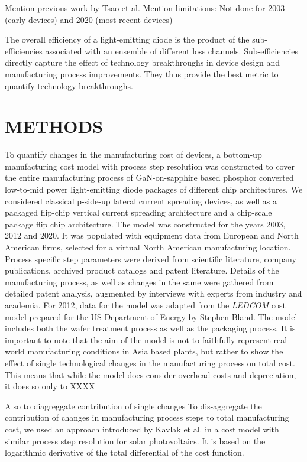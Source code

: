 \documentclass[a4paper]{spie}  %
\begin{document}
Mention previous work by Tsao et al.
Mention limitations: Not done for 2003 (early devices) and 2020 (most recent devices)

The overall efficiency of a light-emitting diode is the product of the sub-efficiencies associated with an ensemble of different loss channels. Sub-efficiencies directly capture the effect of technology breakthroughs in device design and manufacturing process improvements. They thus provide the best metric to quantify technology breakthroughs.
    
\clearpage

\section{METHODS}
\label{sec:methods}

To quantify changes in the manufacturing cost of devices, a bottom-up manufacturing cost model with process step resolution was constructed to cover the entire manufacturing process of GaN-on-sapphire based phosphor converted low-to-mid power light-emitting diode packages of different chip architectures. We considered classical p-side-up lateral current spreading devices, as well as a packaged flip-chip vertical current spreading architecture and a chip-scale package flip chip architecture. The model was constructed for the years 2003, 2012 and 2020. It was populated with equipment data from European and North American firms, selected for a virtual North American manufacturing location. Process specific step parameters were derived from scientific literature, company publications, archived product catalogs and patent literature. Details of the manufacturing process, as well as changes in the same were gathered from detailed patent analysis, augmented by interviews with experts from industry and academia. For 2012, data for the model was adapted from the \textit{LEDCOM} cost model prepared for the US Department of Energy by Stephen Bland. The model includes both the wafer treatment process as well as the packaging process. It is important to note that the aim of the model is not to faithfully represent real world manufacturing conditions in Asia based plants, but rather to show the effect of single technological changes in the manufacturing process on total cost. This means that while the model does consider overhead costs and depreciation, it does so only to XXXX 

Also to diagreggate contribution of single changes
To dis-aggregate the contribution of changes in manufacturing process steps to total manufacturing cost, we used an approach introduced by Kavlak et al. in a cost model with similar process step resolution for solar photovoltaics. It is based on the logarithmic derivative of the total differential of the cost function.
\end{document}
